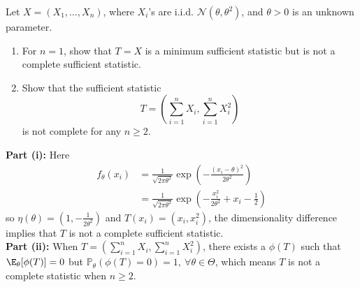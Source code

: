 \documentclass{article}
\begin{document}
\begin{homeworkProblem}

    Let $X = (X_1, \dots, X_n)$, where $X_i$'s are i.i.d. $\mathcal{N}(\theta, \theta^2)$, and $\theta > 0$ is an unknown parameter.
    \begin{enumerate}[label=\roman*), topsep=5pt, itemsep=5pt]
        \item For $n = 1$, show that $T = X$ is a minimum sufficient statistic but is not a complete sufficient statistic.
        \item Show that the sufficient statistic
              \[
                  T = \left(\sum_{i=1}^{n} X_i, \sum_{i=1}^{n} X_{i}^2 \right)
              \]
              is not complete for any $n \geq 2$. \newline
    \end{enumerate}

    \solution

    \textbf{Part (i):} Here
    \begin{align*}
        f_\theta(x_i) & = \frac{1}{\sqrt{2 \pi \theta^2}} \exp \left( -\frac{(x_i - \theta)^2}{2 \theta^2} \right)          \\
                      & = \frac{1}{\sqrt{2 \pi \theta^2}} \exp \left( -\frac{x_i^2}{2 \theta^2} + x_i - \frac{1}{2} \right)
    \end{align*}
    so $\eta(\theta) = \left( 1, -\frac{1}{2\theta^2} \right)$ and $T(x_i) = (x_i, x_i^2)$, the dimensionality difference implies that $T$ is not a complete sufficient statistic. \\

    \textbf{Part (ii):} When $T = \left(\sum_{i=1}^{n} X_i, \sum_{i=1}^{n} X_{i}^2 \right)$, there exists a $\phi(T)$ such that $\E_\theta[\phi(T)] = 0$ but $\mathbb{P}_\theta(\phi(T)=0) = 1, \ \forall \theta \in \Theta$, which means $T$ is not a complete statistic when $n \geq 2$. \\

\end{homeworkProblem}

\pagebreak
\end{document}
